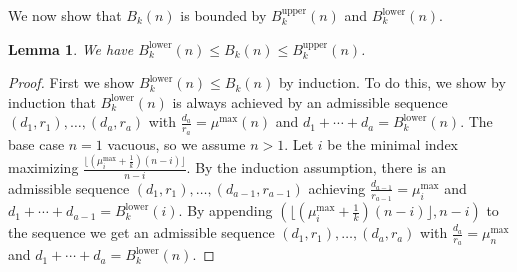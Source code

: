 \documentclass[11pt,reqno]{amsart}
\theoremstyle{plain}
\newtheorem{lemma}[theorem]{Lemma}
\theoremstyle{definition}
\theoremstyle{remark}
\numberwithin{equation}{section}
\numberwithin{equation}{section}
\newcommand{\up}{\textrm{upper}}
\newcommand{\low}{\textrm{lower}}
\begin{document}
We now show that $B_k(n)$ is bounded by $B_k^{\up}(n)$ and $B_k^{\low}(n)$.
\begin{lemma}
\label{rbounds}
We have $B_k^{\low}(n) \leq B_k(n) \leq B_k^{\up}(n)$.
\end{lemma}
\begin{proof}


First we show $B_k^{\low}(n) \leq B_k(n)$ by induction. To do this, we show by induction that $B_k^{\low}(n)$ is always achieved by an admissible sequence $(d_1,r_1),\ldots,(d_a,r_a)$ with $\frac{d_a}{r_a} = \mu^{\max}(n)$ and $d_1+\cdots+d_a = B_k^{\low}(n)$. The base case $n=1$ vacuous, so we assume $n>1$. Let $i$ be the minimal index maximizing $\frac{\lfloor(\mu^{\max}_i+\frac{1}{k})(n-i)\rfloor}{n-i}$. By the induction assumption, there is an admissible sequence $(d_1,r_1),\ldots,(d_{a-1},r_{a-1})$ achieving $\frac{d_{a-1}}{r_{a-1}} = \mu^{\max}_i$ and $d_1+\cdots+d_{a-1} = B_k^{\low}(i)$. By appending $(\lfloor(\mu^{\max}_i+\frac{1}{k})(n-i)\rfloor,n-i)$ to the sequence we get an admissible sequence $(d_1,r_1),\ldots,(d_a,r_a)$ with  $\frac{d_a}{r_a} = \mu^{\max}_n$ and $d_1+\cdots+d_a = B_k^{\low}(n)$.


\end{proof}
\end{document}
